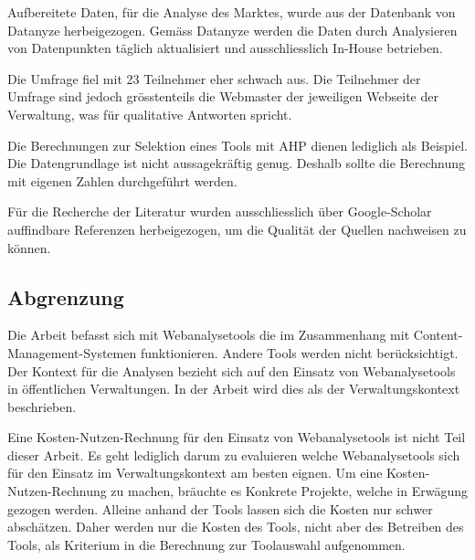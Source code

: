 Aufbereitete Daten, für die Analyse des Marktes, wurde aus der Datenbank von Datanyze \parencite{datanyzeSwitzerlandWebanalytics} herbeigezogen. Gemäss Datanyze \parencite{datanyzeFAQ} werden die Daten durch Analysieren von Datenpunkten täglich aktualisiert und ausschliesslich In-House betrieben.

Die Umfrage fiel mit 23 Teilnehmer eher schwach aus. Die Teilnehmer der Umfrage sind jedoch grösstenteils die Webmaster der jeweiligen Webseite der Verwaltung, was für qualitative Antworten spricht.

Die Berechnungen zur Selektion eines Tools mit AHP dienen lediglich als Beispiel. Die Datengrundlage ist nicht aussagekräftig genug. Deshalb sollte die Berechnung mit eigenen Zahlen durchgeführt werden. 

Für die Recherche der Literatur wurden ausschliesslich über Google-Scholar auffindbare Referenzen herbeigezogen, um die Qualität der Quellen nachweisen zu können.

\subsection{Abgrenzung}
Die Arbeit befasst sich mit Webanalysetools die im Zusammenhang mit Content-Management-Systemen funktionieren. Andere Tools werden nicht berücksichtigt. Der Kontext für die Analysen bezieht sich auf den Einsatz von Webanalysetools in öffentlichen Verwaltungen. In der Arbeit wird dies als der Verwaltungskontext beschrieben. 

Eine Kosten-Nutzen-Rechnung für den Einsatz von Webanalysetools ist nicht Teil dieser Arbeit. Es geht lediglich darum zu evaluieren welche Webanalysetools sich für den Einsatz im Verwaltungskontext am besten eignen. Um eine Kosten-Nutzen-Rechnung zu machen, bräuchte es Konkrete Projekte, welche in Erwägung gezogen werden. Alleine anhand der Tools lassen sich die Kosten nur schwer abschätzen. Daher werden nur die Kosten des  Tools, nicht aber des Betreiben des Tools, als Kriterium in die Berechnung zur Toolauswahl aufgenommen. 